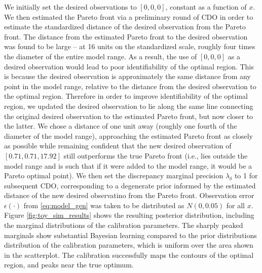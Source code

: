 \documentclass{article}
\begin{document}
We initially set the desired observations to $[0,0,0]$, constant as a function of $x$. 
%
We then estimated the Pareto front via a preliminary round of CDO in order to estimate the standardized distance of the desired observation from the Pareto front.
%
The distance from the estimated Pareto front to the desired observation was found to be large -- at 16 units on the standardized scale, roughly four times the diameter of the entire model range.
%
As a result, the use of $[0,0,0]$ as a desired observation would lead to poor identifiability of the optimal region. 
%
This is because the desired observation is approximately the same distance from any point in the model range, relative to the distance from the desired observation to the optimal region.
%
Therefore in order to improve identifiability of the optimal region, we updated the desired observation to lie along the same line connecting the original desired observation to the estimated Pareto front, but now closer to the latter.
%
We chose a distance of one unit away (roughly one fourth of the diameter of the model range), approaching the estimated Pareto front as closely as possible while remaining confident that the new desired observation of $[0.71, 0.71, 17.92]$ still outperforms the true Pareto front (i.e., lies outside the model range and is such that if it were added to the model range, it would be a Pareto optimal point).
%
We then set the discrepancy marginal precision $\lambda_\delta$ to 1 for subsequent CDO, corresponding to a degenerate prior informed by the estimated distance of the new desired observatino from the Pareto front.
%
Observation error $\epsilon(\cdot)$ from \eqref{eq:model_gen} was taken to be distributed as $N(0,0.05)$ for all $x$.
%
Figure \ref{fig:toy_sim_results} shows the resulting posterior distribution, including the marginal distributions of the calibration parameters. 
%
The sharply peaked marginals show substantial Bayesian learning compared to the prior distributions distribution of the calibration parameters, which is uniform over the area shown in the scatterplot. 
%
The calibration successfully maps the contours of the optimal region, and peaks near the true optimum. 
%
\end{document}
